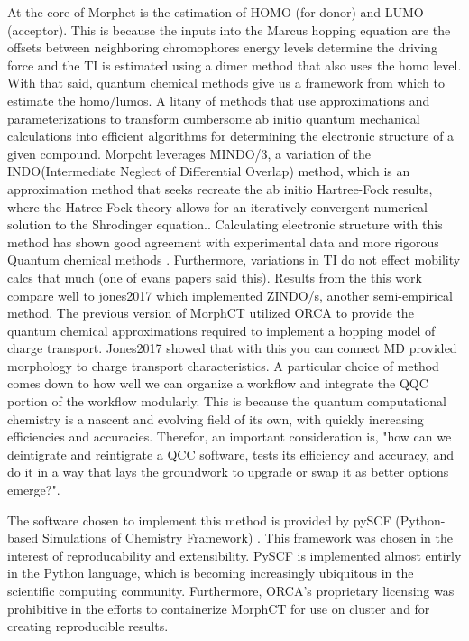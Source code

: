 At the core of Morphct is the estimation of HOMO (for donor) and LUMO (acceptor). This is because 
the inputs into the Marcus hopping equation are the offsets between neighboring  chromophores energy levels
determine the driving force and the TI is estimated using a dimer method that also uses the homo level. 
With that said, quantum chemical methods give us a framework from which to estimate the homo/lumos. A litany of
methods that use approximations and parameterizations to transform cumbersome ab initio quantum mechanical 
calculations into efficient algorithms for determining the electronic structure of a given compound. Morpcht 
leverages MINDO/3, a variation of the INDO(Intermediate Neglect of Differential Overlap) method,
which is an approximation method that seeks recreate the ab initio Hartree-Fock
results, where the Hatree-Fock theory allows for an iteratively convergent numerical solution to the Shrodinger equation.\cite{Thiel2014}. Calculating electronic structure with this method has
shown good agreement with experimental data and more rigorous Quantum chemical
methods 
\cite{Bredas2002}. Furthermore, variations in TI do not effect mobility calcs
that much (one of evans papers said this).  Results
from the this work compare well to jones2017 which implemented ZINDO/s, another
semi-empirical method. The
previous version of MorphCT utilized ORCA \cite{Neese2012b}to provide the quantum chemical
approximations required to implement
a hopping model of charge transport. Jones2017 showed that with this you can connect MD
provided morphology to charge transport characteristics. A particular 
choice of method comes down to how well we can organize a workflow and integrate the QQC portion of the
workflow modularly. This is because the quantum computational chemistry is a nascent and evolving field of its
own, with quickly increasing efficiencies and accuracies. Therefor, an important consideration is, "how can we
deintigrate and reintigrate a QCC software, tests its efficiency and accuracy, and do it in a way that lays
the groundwork to upgrade or swap it as better options emerge?". 

The software chosen to implement this method is
provided by pySCF (Python-based Simulations of Chemistry Framework) \cite{Sun2018a}. This framework
was chosen in the interest of reproducability and extensibility. PySCF is implemented almost entirly in the Python 
language, which is becoming increasingly ubiquitous in the scientific computing community. Furthermore,
ORCA's proprietary licensing was prohibitive in the efforts to containerize MorphCT for use on cluster and for
creating reproducible results. 

